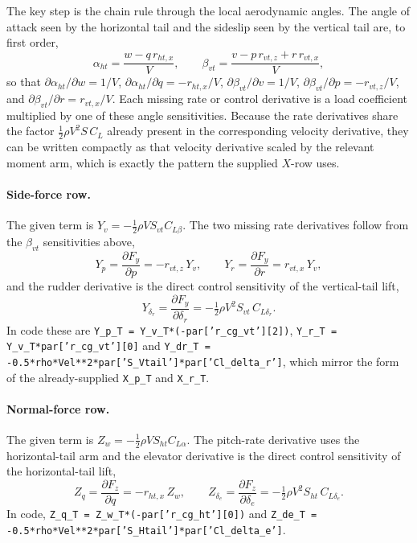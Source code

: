 The key step is the chain rule through the local aerodynamic angles. The angle of attack seen by the horizontal tail and the sideslip seen by the vertical tail are, to first order,
\begin{equation}
    \alpha_{ht} = \frac{w - q\,r_{ht,x}}{V}, \qquad
    \beta_{vt}  = \frac{v - p\,r_{vt,z} + r\,r_{vt,x}}{V},
    \label{eq:tail-local-angles}
\end{equation}
so that $\partial\alpha_{ht}/\partial w = 1/V$, $\partial\alpha_{ht}/\partial q = -r_{ht,x}/V$, $\partial\beta_{vt}/\partial v = 1/V$, $\partial\beta_{vt}/\partial p = -r_{vt,z}/V$, and $\partial\beta_{vt}/\partial r = r_{vt,x}/V$. Each missing rate or control derivative is a load coefficient multiplied by one of these angle sensitivities. Because the rate derivatives share the factor $\tfrac12\rho V^2 S\,C_L$ already present in the corresponding velocity derivative, they can be written compactly as that velocity derivative scaled by the relevant moment arm, which is exactly the pattern the supplied $X$-row uses.

\paragraph{Side-force row.}
The given term is $Y_{v} = -\tfrac12\rho V S_{vt} C_{L\beta}$. The two missing rate derivatives follow from the $\beta_{vt}$ sensitivities above,
\begin{equation}
    Y_{p} = \frac{\partial F_y}{\partial p}
          = -r_{vt,z}\,Y_{v}, \qquad
    Y_{r} = \frac{\partial F_y}{\partial r}
          = r_{vt,x}\,Y_{v},
    \label{eq:tail-Y-rates}
\end{equation}
and the rudder derivative is the direct control sensitivity of the vertical-tail lift,
\begin{equation}
    Y_{\delta_r} = \frac{\partial F_y}{\partial \delta_r}
                 = -\tfrac12\rho V^2 S_{vt}\,C_{L\delta_r}.
    \label{eq:tail-Y-dr}
\end{equation}
In code these are \texttt{Y\_p\_T = Y\_v\_T*(-par['r\_cg\_vt'][2])}, \texttt{Y\_r\_T = Y\_v\_T*par['r\_cg\_vt'][0]} and \texttt{Y\_dr\_T = -0.5*rho*Vel**2*par['S\_Vtail']*par['Cl\_delta\_r']}, which mirror the form of the already-supplied \texttt{X\_p\_T} and \texttt{X\_r\_T}.

\paragraph{Normal-force row.}
The given term is $Z_{w} = -\tfrac12\rho V S_{ht} C_{L\alpha}$. The pitch-rate derivative uses the horizontal-tail arm and the elevator derivative is the direct control sensitivity of the horizontal-tail lift,
\begin{equation}
    Z_{q} = \frac{\partial F_z}{\partial q} = -r_{ht,x}\,Z_{w}, \qquad
    Z_{\delta_e} = \frac{\partial F_z}{\partial \delta_e}
                 = -\tfrac12\rho V^2 S_{ht}\,C_{L\delta_e}.
    \label{eq:tail-Z}
\end{equation}
In code, \texttt{Z\_q\_T = Z\_w\_T*(-par['r\_cg\_ht'][0])} and \texttt{Z\_de\_T = -0.5*rho*Vel**2*par['S\_Htail']*par['Cl\_delta\_e']}.


